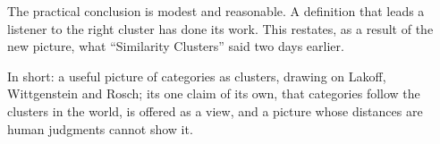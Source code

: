 \begin{afterword}
The practical conclusion is modest and reasonable. A definition that leads a listener to the right cluster has done its work. This restates, as a result of the new picture, what ``Similarity Clusters'' said two days earlier.

In short: a useful picture of categories as clusters, drawing on Lakoff, Wittgenstein and Rosch; its one claim of its own, that categories follow the clusters in the world, is offered as a view, and a picture whose distances are human judgments cannot show it.
\end{afterword}
